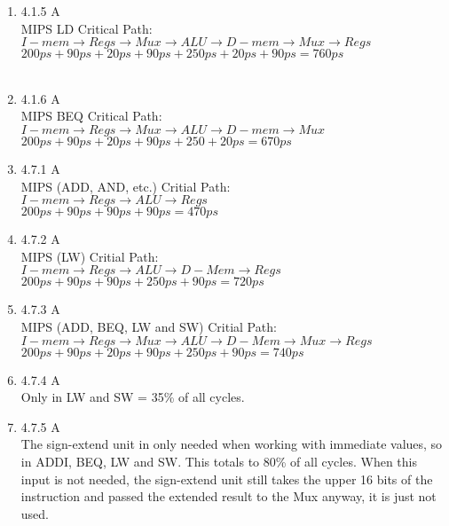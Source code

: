 \documentclass[12pt]{article}
\begin{document}
\begin{enumerate}
\item 4.1.5 A \\
MIPS LD Critical Path: $I-mem\rightarrow Regs\rightarrow Mux\rightarrow ALU \rightarrow D-mem \rightarrow Mux \rightarrow Regs$ \\
$200ps+90ps+20ps+90ps+250ps+20ps+90ps=760ps$\\
\\

\item 4.1.6 A  \\
MIPS BEQ Critical Path: $I-mem\rightarrow Regs\rightarrow Mux\rightarrow ALU \rightarrow D-mem \rightarrow Mux$ \\
$200ps+90ps+20ps+90ps+250+20ps=670ps$
\\

\item 4.7.1 A \\
MIPS (ADD, AND, etc.) Critial Path: \\
$I-mem\rightarrow Regs\rightarrow ALU \rightarrow Regs$ \\
$200ps+90ps+90ps+90ps=470ps$
\\

\item 4.7.2 A \\
MIPS (LW) Critial Path: \\
$I-mem\rightarrow Regs\rightarrow ALU \rightarrow D-Mem \rightarrow Regs$ \\
$200ps+90ps+90ps+250ps+90ps=720ps$
\\

\item 4.7.3 A \\
MIPS (ADD, BEQ, LW and SW) Critial Path: \\
$I-mem\rightarrow Regs\rightarrow Mux \rightarrow ALU \rightarrow D-Mem \rightarrow Mux \rightarrow Regs$ \\
$200ps+90ps+20ps+90ps+250ps+90ps=740ps$
\\

\item 4.7.4 A \\
Only in LW and SW = 35\% of all cycles.
\\

\item 4.7.5 A \\
The sign-extend unit in only needed when working with immediate values, so in ADDI, BEQ, LW and SW. This totals to 80\% of all cycles. When this input is not needed, the sign-extend unit still takes the upper 16 bits of the instruction and passed the extended result to the Mux anyway, it is just not used.
\\


\end{enumerate}
\end{document}
